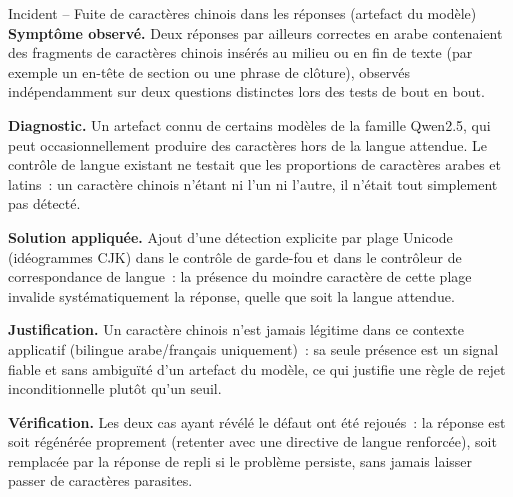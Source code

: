 \begin{probbox}{Incident -- Fuite de caractères chinois dans les réponses (artefact du modèle)}
\textbf{Symptôme observé.} Deux réponses par ailleurs correctes en arabe contenaient des fragments de caractères chinois insérés au milieu ou en fin de texte (par exemple un en-tête de section ou une phrase de clôture), observés indépendamment sur deux questions distinctes lors des tests de bout en bout.

\textbf{Diagnostic.} Un artefact connu de certains modèles de la famille Qwen2.5, qui peut occasionnellement produire des caractères hors de la langue attendue. Le contrôle de langue existant ne testait que les proportions de caractères arabes et latins~: un caractère chinois n'étant ni l'un ni l'autre, il n'était tout simplement pas détecté.

\textbf{Solution appliquée.} Ajout d'une détection explicite par plage Unicode (idéogrammes CJK) dans le contrôle de garde-fou et dans le contrôleur de correspondance de langue~: la présence du moindre caractère de cette plage invalide systématiquement la réponse, quelle que soit la langue attendue.

\textbf{Justification.} Un caractère chinois n'est jamais légitime dans ce contexte applicatif (bilingue arabe/français uniquement)~: sa seule présence est un signal fiable et sans ambiguïté d'un artefact du modèle, ce qui justifie une règle de rejet inconditionnelle plutôt qu'un seuil.

\textbf{Vérification.} Les deux cas ayant révélé le défaut ont été rejoués~: la réponse est soit régénérée proprement (retenter avec une directive de langue renforcée), soit remplacée par la réponse de repli si le problème persiste, sans jamais laisser passer de caractères parasites.
\end{probbox}

